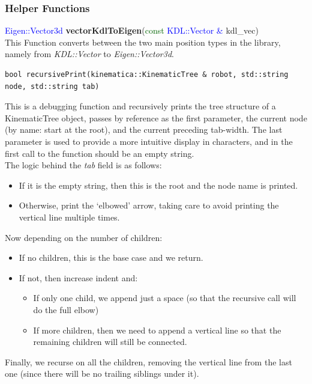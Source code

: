 \documentclass[12pt,a4paper,onecolumn]{article}
\begin{document}
\subsubsection*{Helper Functions}

\textcolor{blue}{Eigen::Vector3d} \textbf{vectorKdlToEigen}(\textcolor{DarkGreen}{const} \textcolor{blue}{KDL::Vector \&} kdl\_vec)\\
\noindent This Function converts between the two main position types in the library, namely from \textit{KDL::Vector} to \textit{Eigen::Vector3d}.\\
\newline
\begin{lstlisting}
bool recursivePrint(kinematica::KinematicTree & robot, std::string node, std::string tab)
\end{lstlisting}
This is a debugging function and recursively prints the tree structure of a KinematicTree object, passes by reference as the first parameter, the current node (by name: start at the root), and the current preceding tab-width. The last parameter is used to provide a more intuitive display in characters, and in the first call to the function should be an empty string.\\
\newline
\noindent The logic behind the \textit{tab} field is as follows:
\begin{itemize}
\item If it is the empty string, then this is the root and the node name is printed.
\item Otherwise, print the `elbowed' arrow, taking care to avoid printing the vertical line multiple times.
\end{itemize}
Now depending on the number of children:
\begin{itemize}
\item If no children, this is the base case and we return.
\item If not, then increase indent and:
\begin{itemize}
\item If only one child, we append just a space (so that the recursive call will do the full elbow)
\item If more children, then we need to append a vertical line so that the remaining children will still be connected.
\end{itemize}
\end{itemize}
Finally, we recurse on all the children, removing the vertical line from the last one (since there will be no trailing siblings under it).
\end{document}
